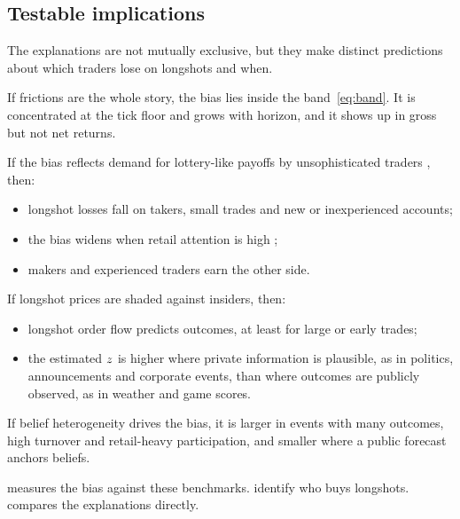 \subsection{Testable implications}\label{sec:framework-hypotheses}

The explanations are not mutually exclusive, but they make distinct predictions about which
traders lose on longshots and when.

\begin{hypothesis}[Mechanical]\label{hyp:mech}
If frictions are the whole story, the bias lies inside the band~\eqref{eq:band}. It is
concentrated at the tick floor and grows with horizon, and it shows up in gross but not net
returns.
\end{hypothesis}
\begin{hypothesis}\label{hyp:pref}
If the bias reflects demand for lottery-like payoffs by unsophisticated traders
\citep{kumar2009,barberis2008}, then:
\begin{itemize}
  \item longshot losses fall on takers, small trades and new or inexperienced accounts;
  \item the bias widens when retail attention is high \citep{barberodean2008,barber2022};
  \item makers and experienced traders earn the other side.
\end{itemize}
\end{hypothesis}
\begin{hypothesis}[Information]\label{hyp:info}
If longshot prices are shaded against insiders, then:
\begin{itemize}
  \item longshot order flow predicts outcomes, at least for large or early trades;
  \item the estimated $z$ is higher where private information is plausible, as in
  politics, announcements and corporate events, than where outcomes are publicly observed, as in
  weather and game scores.
\end{itemize}
\end{hypothesis}
\begin{hypothesis}\label{hyp:beliefs}
If belief heterogeneity drives the bias, it is larger in events with many outcomes, high
turnover and retail-heavy participation, and smaller where a public forecast anchors beliefs.
\end{hypothesis}

 measures the bias against these benchmarks.
 identify who buys longshots. 
compares the explanations directly.
